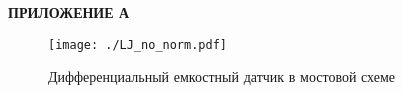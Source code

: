 \newpage
\begin{flushleft}
  \textbf{\large ПРИЛОЖЕНИЕ А}
\end{flushleft}

\begin{figure}[ht]
  \centering
  \texttt{[image: ./LJ\_no\_norm.pdf]}
  \label{fig:5_2}
	\caption{Дифференциальный емкостный датчик в мостовой схеме}

  \end{figure}
